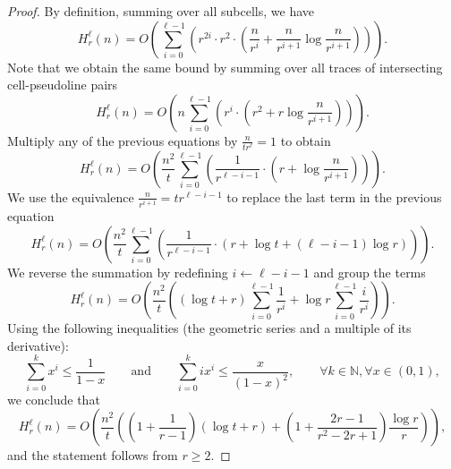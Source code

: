 \begin{proof}
By definition, summing over all subcells, we have
\begin{displaymath} %
H_r^\ell(n)
= O \left(
    \sum_{i=0}^{\ell-1} \left(
	r^{2i} \cdot r^2 \cdot \left(
    \frac{n}{r^i} + \frac{n}{r^{i+1}} \log \frac{n}{r^{i+1}}
    \right)
\right)
\right).
\end{displaymath}
%
Note that we obtain the same bound by
summing over all traces of intersecting cell-pseudoline pairs
%
\begin{displaymath}
H_r^\ell(n)
= O \left(
    n
    \sum_{i=0}^{\ell-1} \left(
      r^i \cdot
      \left(
        r^2 + r \log \frac{n}{r^{i+1}}
      \right)
    \right)
\right).
\end{displaymath}
%
Multiply any of the previous equations by \(\frac{n}{tr^\ell} = 1\)
to obtain
%
\begin{displaymath}
H_r^\ell(n)
= O \left(
\frac{n^2}{t}
    \sum_{i=0}^{\ell-1} \left(
      \frac{1}{r^{\ell - i - 1}} \cdot \left(
	r + \log \frac{n}{r^{i+1}}
    \right)
\right)
\right).
\end{displaymath}
%
We use the equivalence \(\frac{n}{r^{i+1}} = t r^{\ell - i - 1}\) to replace
the last term in the previous equation
%
\begin{displaymath}
H_r^\ell(n)
= O \left(
\frac{n^2}{t}
    \sum_{i=0}^{\ell-1} \left(
      \frac{1}{r^{\ell - i - 1}} \cdot \left(
	r + \log t + (\ell - i - 1) \log r
    \right)
\right)
\right).
\end{displaymath}
%
We reverse the summation by redefining \(i \leftarrow \ell - i - 1\) and group the terms
%
\begin{displaymath}
H_r^\ell(n)
=
O \left(
\frac{n^2}{t} \left(
	(\log t + r)  \sum_{i=0}^{\ell-1} \frac{1}{r^{i}}
	+
	\log r \sum_{i=0}^{\ell-1} \frac{i}{r^{i}}
\right)
\right).
\end{displaymath}
%
Using the following inequalities (the geometric series and a multiple of its derivative):
%
\begin{displaymath}
\sum_{i = 0}^{k} x^i
\le
\frac{1}{1-x}
\qquad
\text{and}
\qquad
\sum_{i = 0}^{k} i x^i
\le
\frac{x}{{(1-x)}^2},
\qquad
\forall k \in \mathbb{N},
\forall x \in (0,1),
\end{displaymath}
%
we conclude that
%
\begin{displaymath}
H_r^\ell(n)
=
O\left(
\frac{n^2}{t} \left(
	\left(1 + \frac{1}{r-1} \right) (\log t + r)
	+
	\left(1 + \frac{2r-1}{r^2-2r+1}\right) \frac{\log r}{r}
\right)
\right),
\end{displaymath}
%
and the statement follows from \(r \geq 2\).
\end{proof}

